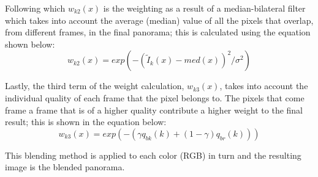 Following which $w_{k2}(x)$ is the weighting as a result of a median-bilateral filter which takes into account
the average (median) value of all the pixels that overlap, from different frames, in the final panorama; this
is calculated using the equation shown below:
\begin{equation}
w_{k2}(x) = exp (-(\tilde{I}_k(x)-med(x))^2/\sigma^2)
\end{equation}

Lastly, the third term of the weight calculation, $w_{k3}(x)$, takes into account the individual quality of 
each frame that the pixel belongs to. The pixels that come frame a frame that is of a higher quality contribute
a higher weight to the final result; this is shown in the equation below:
\begin{equation}
w_{k3}(x) = exp (-(\gamma q_{bk}(k) + (1 - \gamma)q_{br}(k)))
\end{equation}

This blending method is applied to each color (RGB) in turn and the resulting image is the blended panorama.